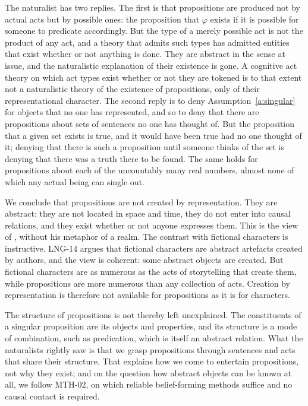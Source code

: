 \documentclass{situationist-preprint}
\begin{document}
The naturalist has two replies. The first is that propositions are produced not by actual acts but by possible ones: the proposition that $\varphi$ exists if it is possible for someone to predicate accordingly. But the type of a merely possible act is not the product of any act, and a theory that admits such types has admitted entities that exist whether or not anything is done. They are abstract in the sense at issue, and the naturalistic explanation of their existence is gone. A cognitive act theory on which act types exist whether or not they are tokened is to that extent not a naturalistic theory of the existence of propositions, only of their representational character. The second reply is to deny Assumption~\ref{a:singular} for objects that no one has represented, and so to deny that there are propositions about sets of sentences no one has thought of. But the proposition that a given set exists is true, and it would have been true had no one thought of it; denying that there is such a proposition until someone thinks of the set is denying that there was a truth there to be found. The same holds for propositions about each of the uncountably many real numbers, almost none of which any actual being can single out.

We conclude that propositions are not created by representation. They are abstract: they are not located in space and time, they do not enter into causal relations, and they exist whether or not anyone expresses them. This is the view of \citet{Frege1918}, without his metaphor of a realm. The contrast with fictional characters is instructive. LNG-14 argues that fictional characters are abstract artefacts created by authors, and the view is coherent: some abstract objects are created. But fictional characters are as numerous as the acts of storytelling that create them, while propositions are more numerous than any collection of acts. Creation by representation is therefore not available for propositions as it is for characters.

The structure of propositions is not thereby left unexplained. The constituents of a singular proposition are its objects and properties, and its structure is a mode of combination, such as predication, which is itself an abstract relation. What the naturalists rightly saw is that we grasp propositions through sentences and acts that share their structure. That explains how we come to entertain propositions, not why they exist; and on the question how abstract objects can be known at all, we follow MTH-02, on which reliable belief-forming methods suffice and no causal contact is required.
\end{document}
